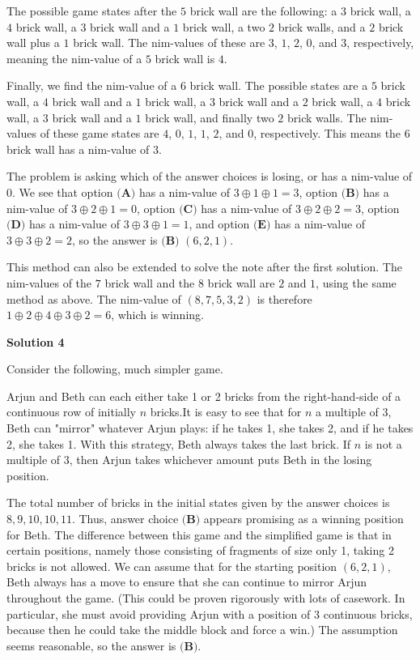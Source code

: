 \begin{enumerate}
 The possible game states after the $5$ brick wall are the following: a $3$ brick wall, a $4$ brick wall, a $3$ brick wall and a $1$ brick wall, a two $2$ brick walls, and a $2$ brick wall plus a $1$ brick wall. The nim-values of these are $3$, $1$, $2$, $0$, and $3$, respectively, meaning the nim-value of a $5$ brick wall is $4$. 

 Finally, we find the nim-value of a $6$ brick wall. The possible states are a $5$ brick wall, a $4$ brick wall and a $1$ brick wall, a $3$ brick wall and a $2$ brick wall, a $4$ brick wall, a $3$ brick wall and a $1$ brick wall, and finally two $2$ brick walls. The nim-values of these game states are $4$, $0$, $1$, $1$, $2$, and $0$, respectively. This means the $6$ brick wall has a nim-value of $3$. 

 The problem is asking which of the answer choices is losing, or has a nim-value of $0$. We see that option $\textbf{(A)}$ has a nim-value of $3\oplus1\oplus1=3$, option $\textbf{(B)}$ has a nim-value of $3\oplus2\oplus1=0$, option $\textbf{(C)}$ has a nim-value of $3\oplus2\oplus2=3$, option $\textbf{(D)}$ has a nim-value of $3\oplus3\oplus1=1$, and option $\textbf{(E)}$ has a nim-value of $3\oplus3\oplus2=2$, so the answer is $\boxed{\textbf{(B) }(6, 2, 1)}$.

 This method can also be extended to solve the note after the first solution. The nim-values of the $7$ brick wall and the $8$ brick wall are $2$ and $1$, using the same method as above. The nim-value of $(8, 7, 5, 3, 2)$ is therefore $1\oplus2\oplus4\oplus3\oplus2 = 6$, which is winning.

 



\textbf{Solution 4}

Consider the following, much simpler game.

 Arjun and Beth can each either take 1 or 2 bricks from the right-hand-side of a continuous row of initially $n$ bricks.It is easy to see that for $n$ a multiple of 3, Beth can "mirror" whatever Arjun plays: if he takes 1, she takes 2, and if he takes 2, she takes 1. With this strategy, Beth always takes the last brick. If $n$ is not a multiple of 3, then Arjun takes whichever amount puts Beth in the losing position.

 The total number of bricks in the initial states given by the answer choices is $8, 9, 10, 10, 11$. Thus, answer choice $\textbf{(B)}$ appears promising as a winning position for Beth. The difference between this game and the simplified game is that in certain positions, namely those consisting of fragments of size only 1, taking 2 bricks is not allowed. We can assume that for the starting position $(6, 2, 1)$, Beth always has a move to ensure that she can continue to mirror Arjun throughout the game. (This could be proven rigorously with lots of casework. In particular, she must avoid providing Arjun with a position of 3 continuous bricks, because then he could take the middle block and force a win.) The assumption seems reasonable, so the answer is $\boxed{\textbf{(B)}}$.


\end{enumerate}
